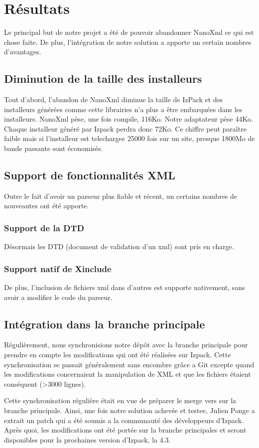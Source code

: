\section{Résultats}
Le principal but de notre projet a été de pouvoir abandonner NanoXml ce qui est chose faite. De plus, l'intégration de notre solution a apporte un certain nombres d'avantages.
\subsection{Diminution de la taille des installeurs}
Tout d'abord, l'abandon de NanoXml diminue la taille de IzPack et des installeurs générées comme cette librairies n'a plus a être embarquées dans les installeurs. NanoXml pèse, une fois compile, 116Ko. Notre adaptateur pèse 44Ko. Chaque installeur généré par Izpack perdra donc 72Ko. Ce chiffre peut paraître faible mais si l'installeur est telechargee 25000 fois sur un site, presque 1800Mo de bande passante sont économisés.
\subsection{Support de fonctionnalités XML}
Outre le fait d'avoir un parseur plus fiable et récent, un certains nombres de nouveautes ont été apporte.
\subsubsection{Support de la DTD}
Désormais les DTD (document de validation d'un xml) sont pris en charge.
\subsubsection{Support natif de Xinclude}
De plus, l'inclusion de fichiers xml dans d'autres est supporte nativement, sans avoir a modifier le code du parseur.
\subsection{Intégration dans la branche principale}
Régulièrement, nous synchronisions notre dépôt avec la branche principale pour prendre en compte les modifications qui ont été réalisées sur Izpack. Cette synchronisation se passait généralement sans encombre grâce a Git excepte quand les modifications concernaient la manipulation de XML et que les fichiers étaient conséquent (>3000 lignes).

Cette synchronisation régulière était en vue de préparer le merge vers sur la branche principale. Ainsi, une fois notre solution achevée et testee, Julien Ponge a extrait un patch qui a été soumis a la communauté des développeurs d'Izpack. Après quoi, les modifications ont été portée sur la branche principales et seront disponibles pour la prochaines version d'Izpack, la 4.3.

